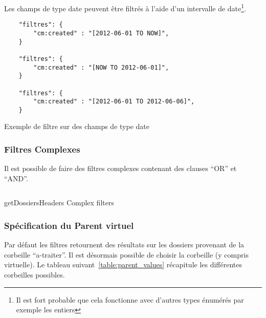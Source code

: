 Les champs de type date peuvent être filtrés à l'aide d'un intervalle de date\footnote{Il est fort probable que cela fonctionne avec d'autres types énumérés par exemple les entiers}.

\begin{codesnippet}
\begin{verbatim}
	"filtres": {
		"cm:created" : "[2012-06-01 TO NOW]",
	}
	
	"filtres": {
		"cm:created" : "[NOW TO 2012-06-01]",
	}
	
	"filtres": {
		"cm:created" : "[2012-06-01 TO 2012-06-06]",
	}
\end{verbatim}
\caption{Exemple de filtre sur des champs de type date}
\end{codesnippet}

\subsubsection{Filtres Complexes}
Il est possible de faire des filtres complexes contenant des clauses ``OR'' et ``AND''.

\begin{codesnippet}
\inputminted[frame=single,linenos,fontsize=\footnotesize]{javascript}{extraits/getDossiersHeaders_search_complex_in.js}
\caption{getDossiersHeaders Complex filters}
\label{snip:getTypologie_in}
\end{codesnippet}

\subsubsection{Spécification du Parent virtuel}

Par défaut les filtres retournent des résultats sur les dossiers provenant de la corbeille ``a-traiter''. Il est désormais possible de
choisir la corbeille (y compris virtuelle). Le tableau suivant~\ref{table:parent_values} récapitule les différentes corbeilles possibles.

